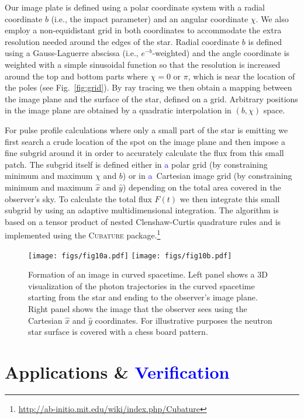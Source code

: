 \documentclass{aa}
\newcommand{\refe}[1]{\textcolor{blue}{{#1}}}
\begin{document}
Our image plate is defined using a polar coordinate system with a radial
coordinate $b$ (i.e., the impact parameter) and an angular coordinate $\chi$.
We also employ a non-equidistant grid in both coordinates to accommodate
the extra resolution needed around the edges of the star.  Radial
coordinate $b$ is defined using a Gauss-Laguerre abscissa (i.e.,
$e^{-b}$-weighted) and the angle coordinate is weighted with a simple
sinusoidal function so that the resolution is increased around the top
and bottom parts where $\chi = 0$ or $\pi$, which is near the location of the poles
(see Fig.~\ref{fig:grid}).  By ray tracing we then obtain
a mapping between the image plane and the surface of the star, defined
on a grid.
Arbitrary positions in the image plane are obtained by a quadratic interpolation in $(b, \chi)$ space.

For pulse profile calculations where only a small part of the star is
emitting we first search a crude location of the spot on the image plane
and then impose a fine subgrid around it in order to accurately
calculate the flux from this small patch.  The subgrid itself is defined
either in \refe{a} polar grid (by constraining minimum and maximum $\chi$ and
$b$) or in \refe{a} Cartesian image grid (by constraining minimum and maximum
$\hat{x}$ and $\hat{y}$) depending on the total area covered in the observer's sky.  To
calculate the total flux $F(t)$ we then integrate this small subgrid by
using an adaptive multidimensional integration.  The algorithm is based
on a tensor product of nested Clenshaw-Curtis quadrature rules and is
implemented using the \textsc{Cubature} package.\footnote{
\url{http://ab-initio.mit.edu/wiki/index.php/Cubature}}



\begin{figure}
\centering
\texttt{[image: figs/fig10a.pdf]}
\texttt{[image: figs/fig10b.pdf]}
\caption{\label{fig:image}
  Formation of an image in curved spacetime.
  Left panel shows a 3D visualization of the photon trajectories in the curved spacetime starting from the star and ending to the observer's image plane.
  Right panel shows the image that the observer sees using the Cartesian $\hat{x}$ and $\hat{y}$ coordinates.
  For illustrative purposes the neutron star surface is covered with a chess board pattern.
  }
\end{figure}


\section{Applications \& \refe{Verification}}\label{sect:appl}
\end{document}
